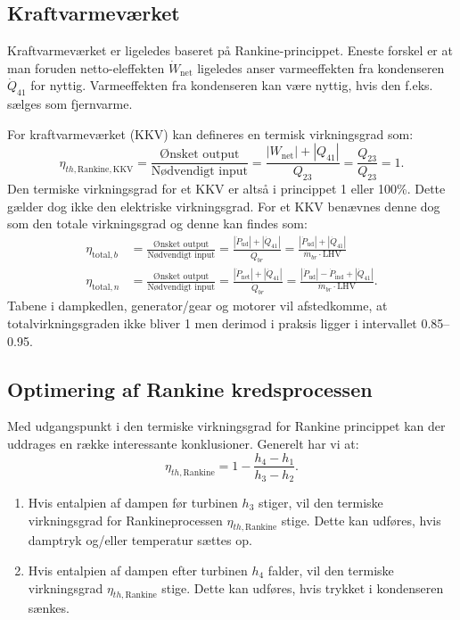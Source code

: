 \subsection{Kraftvarmeværket}
Kraftvarmeværket er ligeledes baseret på Rankine-princippet. Eneste forskel er at man foruden netto-eleffekten $\dot{W}_{\mathrm{net}}$ ligeledes anser varmeeffekten fra kondenseren $\dot{Q}_{41}$ for nyttig. Varmeeffekten fra kondenseren kan være nyttig, hvis den f.eks. sælges som fjernvarme.

For kraftvarmeværket (KKV) kan defineres en termisk virkningsgrad som:
\[ 
\eta_{th, \mathrm{Rankine, KKV}} = \frac{\text{Ønsket output}}{\text{Nødvendigt input}} = \frac{\left| W_{\mathrm{net}} \right| + \left| Q_{41} \right|}{Q_{23}} = \frac{Q_{23}}{Q_{23}} = 1
.\]
Den termiske virkningsgrad for et KKV er altså i princippet 1 eller 100\%. Dette gælder dog ikke den elektriske virkningsgrad. For et KKV benævnes denne dog som den totale virkningsgrad og denne kan findes som:
\begin{align*}
  \eta_{\mathrm{total}, b} &= \frac{\text{Ønsket output}}{\text{Nødvendigt input}} = \frac{\left| \dot{P}_{\mathrm{ud}} \right| + \left| \dot{Q}_{41} \right|}{\dot{Q}_{br}} = \frac{\left| \dot{P}_{\mathrm{ud}} \right| + \left| \dot{Q}_{41} \right|}{\dot{m}_{br} \cdot \mathrm{LHV}} \\
  \eta_{\mathrm{total}, n} &= \frac{\text{Ønsket output}}{\text{Nødvendigt input}} = \frac{\left| \dot{P}_{\mathrm{net}} \right| + \left| \dot{Q}_{41} \right|}{\dot{Q}_{br}} = \frac{\left| \dot{P}_{\mathrm{ud}} \right| - \dot{P}_{\mathrm{ind}} + \left| \dot{Q}_{41} \right|}{\dot{m}_{br} \cdot \mathrm{LHV}}
.\end{align*}
Tabene i dampkedlen, generator/gear og motorer vil afstedkomme, at totalvirkningsgraden ikke bliver 1 men derimod i praksis ligger i intervallet \num{0,85}--\num{0,95}.

\subsection{Optimering af Rankine kredsprocessen} \label{afs:optRan}
Med udgangspunkt i den termiske virkningsgrad for Rankine princippet kan der uddrages en række interessante konklusioner. Generelt har vi at:
\[ 
\eta_{th, \mathrm{Rankine}} = 1 - \frac{h_4 - h_1}{h_3 - h_2}
.\]
\begin{enumerate}
  \item Hvis entalpien af dampen før turbinen $h_3$ stiger, vil den termiske virkningsgrad for Rankineprocessen $\eta_{th, \mathrm{Rankine}}$ stige. Dette kan udføres, hvis damptryk og/eller temperatur sættes op.
  \item Hvis entalpien af dampen efter turbinen $h_4$ falder, vil den termiske virkningsgrad $\eta_{th, \mathrm{Rankine}}$ stige. Dette kan udføres, hvis trykket i kondenseren sænkes.
\end{enumerate}

